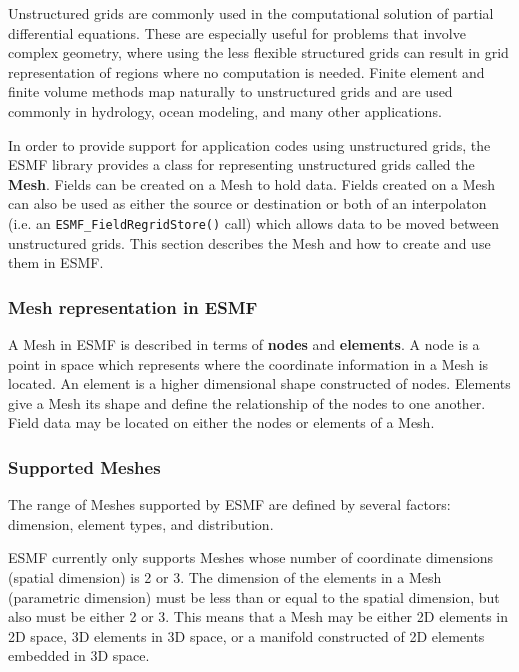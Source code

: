 
Unstructured grids are commonly used in the computational solution of partial differential 
equations.  These are especially useful for problems that involve complex geometry, where 
using the less flexible structured grids can result in grid representation of regions 
where no computation is needed.  Finite element and finite volume methods map naturally 
to unstructured grids and are used commonly in hydrology, ocean modeling, and many other 
applications.

In order to provide support for application codes using unstructured grids, the ESMF library 
provides a class for representing unstructured grids called the {\bf Mesh}. Fields can be 
created on a Mesh to hold data. Fields created on a Mesh can also be used as either the 
source or destination or both of an interpolaton (i.e. an {\tt ESMF\_FieldRegridStore()} call) 
which allows data to be moved between unstructured grids. This section describes the Mesh 
and how to create and use them in ESMF. 

\subsubsection{Mesh representation in ESMF}

A Mesh in ESMF is described in terms of {\bf nodes} and {\bf elements}. A node is a point 
in space which represents where the coordinate information in a Mesh is located. An element 
is a higher dimensional shape constructed of nodes. Elements give a Mesh its shape and define 
the relationship of the nodes to one another. Field data may be located on either the nodes
or elements of a Mesh. 

\subsubsection{Supported Meshes}

The range of Meshes supported by ESMF are defined by several factors: dimension, element 
types, and distribution.

ESMF currently only supports Meshes whose number of coordinate dimensions (spatial dimension) 
is 2 or 3. The dimension of the elements in a Mesh (parametric dimension) must be less than 
or equal to the spatial dimension, but also must be either 2 or 3. This means that a Mesh may 
be either 2D elements in 2D space, 3D elements in 3D space, or a manifold constructed of 2D 
elements embedded in 3D space. 

